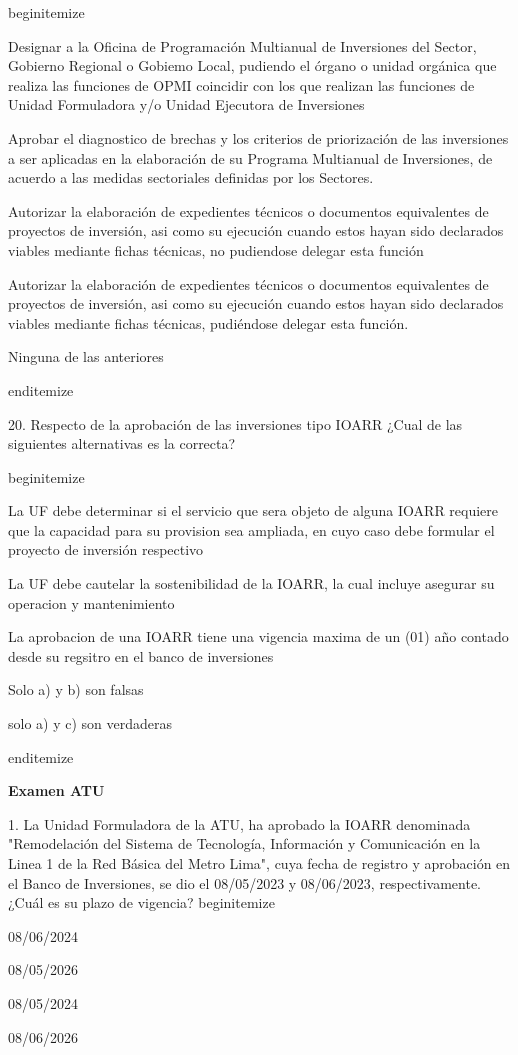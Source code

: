 begin{itemize}
			\item Designar a la Oficina de Programación Multianual de Inversiones del Sector, Gobierno Regional o Gobiemo Local, pudiendo el órgano o unidad orgánica que realiza las funciones de OPMI coincidir con los que realizan las funciones de Unidad Formuladora y/o Unidad Ejecutora de Inversiones
			\item Aprobar el diagnostico de brechas y los criterios de priorización de las inversiones a ser aplicadas en la elaboración de su Programa Multianual de Inversiones, de acuerdo a las medidas sectoriales definidas por los Sectores.
			\item Autorizar la elaboración de expedientes técnicos o documentos equivalentes de proyectos de inversión, asi como su ejecución cuando estos hayan sido declarados viables mediante fichas técnicas, no pudiendose delegar esta función
			\item Autorizar la elaboración de expedientes técnicos o documentos equivalentes de proyectos de inversión, asi como su ejecución cuando estos hayan sido declarados viables mediante fichas técnicas, pudiéndose delegar esta función.
			\item Ninguna de las anteriores

end{itemize}

20. Respecto de la aprobación de las inversiones tipo IOARR ¿Cual de las siguientes alternativas es la correcta?

begin{itemize}
			\item La UF debe determinar si el servicio que sera objeto de alguna IOARR requiere que la capacidad para su provision sea ampliada, en cuyo caso debe formular el proyecto de inversión respectivo
			\item La UF debe cautelar la sostenibilidad de la IOARR, la cual incluye asegurar su operacion y mantenimiento 
			\item La aprobacion de una IOARR tiene una vigencia maxima de un (01) año contado desde su regsitro en el banco de inversiones
			\item Solo a) y b) son falsas
			\item solo a) y c) son verdaderas

end{itemize}

\textbf{Examen ATU} 

1. La Unidad Formuladora de la ATU, ha aprobado la IOARR denominada "Remodelación del Sistema de Tecnología, Información y Comunicación en la Linea 1 de la Red Básica del Metro Lima", cuya fecha de registro y aprobación en el Banco de Inversiones, se dio el 08/05/2023 y 08/06/2023, respectivamente. ¿Cuál es su plazo de vigencia?
begin{itemize}
			\item 08/06/2024
			\item 08/05/2026
			\item 08/05/2024
			\item 08/06/2026

